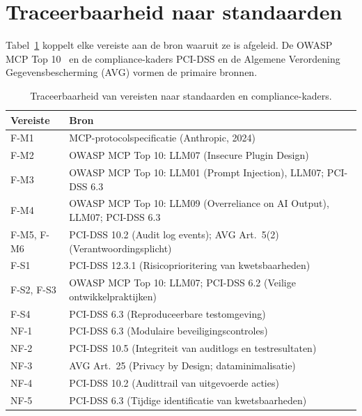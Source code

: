\section{Traceerbaarheid naar standaarden}

Tabel~\ref{tab:traceability} koppelt elke vereiste aan de bron waaruit ze is afgeleid. De OWASP MCP Top 10~\autocite{OWASP2025} en de compliance-kaders PCI-DSS en de Algemene Verordening Gegevensbescherming (AVG) vormen de primaire bronnen.

\begin{table}[htbp]
    \centering
    \caption{Traceerbaarheid van vereisten naar standaarden en compliance-kaders.}
    \label{tab:traceability}
    \begin{tabular}{@{}lp{9.5cm}@{}}
        \toprule
        \textbf{Vereiste} & \textbf{Bron} \\ \midrule
        F-M1 & MCP-protocolspecificatie (Anthropic, 2024) \\
        F-M2 & OWASP MCP Top 10: LLM07 (Insecure Plugin Design) \\
        F-M3 & OWASP MCP Top 10: LLM01 (Prompt Injection), LLM07; PCI-DSS 6.3 \\
        F-M4 & OWASP MCP Top 10: LLM09 (Overreliance on AI Output), LLM07; PCI-DSS 6.3 \\
        F-M5, F-M6 & PCI-DSS 10.2 (Audit log events); AVG Art.~5(2) (Verantwoordingsplicht) \\
        F-S1 & PCI-DSS 12.3.1 (Risicoprioritering van kwetsbaarheden) \\
        F-S2, F-S3 & OWASP MCP Top 10: LLM07; PCI-DSS 6.2 (Veilige ontwikkelpraktijken) \\
        F-S4 & PCI-DSS 6.3 (Reproduceerbare testomgeving) \\
        NF-1 & PCI-DSS 6.3 (Modulaire beveiligingscontroles) \\
        NF-2 & PCI-DSS 10.5 (Integriteit van auditlogs en testresultaten) \\
        NF-3 & AVG Art.~25 (Privacy by Design; dataminimalisatie) \\
        NF-4 & PCI-DSS 10.2 (Audittrail van uitgevoerde acties) \\
        NF-5 & PCI-DSS 6.3 (Tijdige identificatie van kwetsbaarheden) \\ \bottomrule
    \end{tabular}
\end{table}
